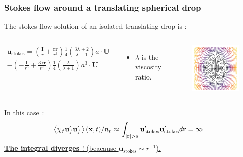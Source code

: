 \documentclass{sintefbeamer}
\begin{document}
\begin{frame}
  \frametitle{Stokes flow around a translating spherical drop}
  The stokes flow solution of an isolated translating drop is :
  \begin{columns}
  \begin{multline*}
    \textbf{u}_\text{stokes} 
    = \left(\frac{ \textbf{I}}{r} + \frac{\textbf{rr}}{r^3}\right)  \frac{1}{4}\left(\frac{3\lambda + 2}{\lambda +1}\right) a \cdot \textbf{U}\\
    - \left(-\frac{\textbf{I}}{r^3} + \frac{3 \textbf{rr} }{r^5}\right)  \frac{1}{4}\left(\frac{\lambda}{\lambda +1}\right) a^3 \cdot \textbf{U}
  \end{multline*}
  \begin{itemize}
      \item $\lambda$ is the viscosity ratio.
  \end{itemize}
  \begin{figure}
    \includegraphics[width=\textwidth]{image/Rising_Stokes.png}
  \end{figure}
  \end{columns}
\pause
  In this case : 
  \begin{align*}
    \left<\chi_f \textbf{u}'_f\textbf{u}'_f\right>(\textbf{x},t) / n_p
    &\approx 
    \int_{|\textbf{r}| > a} \textbf{u}'_\text{stokes}\textbf{u}'_\text{stokes}   d\textbf{r}
    =\infty 
  \end{align*}
  \underline{\textbf{The integral diverges}  ! (beacause $\textbf{u}_\text{stokes} \sim r^{-1}$).}



\end{frame}
\end{document}
